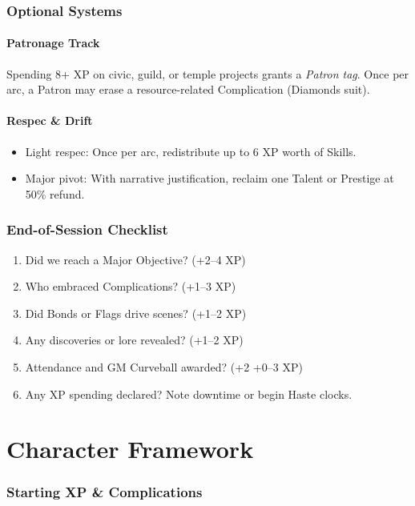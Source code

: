 \documentclass[12pt]{book}
\begin{document}
\section{Optional Systems}

\subsection*{Patronage Track}
Spending 8+ XP on civic, guild, or temple projects grants a \emph{Patron tag}.  
Once per arc, a Patron may erase a resource-related Complication (Diamonds suit).

\subsection*{Respec \& Drift}
\begin{itemize}
  \item Light respec: Once per arc, redistribute up to 6 XP worth of Skills.  
  \item Major pivot: With narrative justification, reclaim one Talent or Prestige at 50\% refund.  
\end{itemize}

\section{End-of-Session Checklist}

\begin{enumerate}
  \item Did we reach a Major Objective? (+2--4 XP)  
  \item Who embraced Complications? (+1--3 XP)  
  \item Did Bonds or Flags drive scenes? (+1--2 XP)  
  \item Any discoveries or lore revealed? (+1--2 XP)  
  \item Attendance and GM Curveball awarded? (+2 +0--3 XP)  
  \item Any XP spending declared? Note downtime or begin Haste clocks.  
\end{enumerate}


\part{Character Framework}

\section{Starting XP \& Complications}
\end{document}
